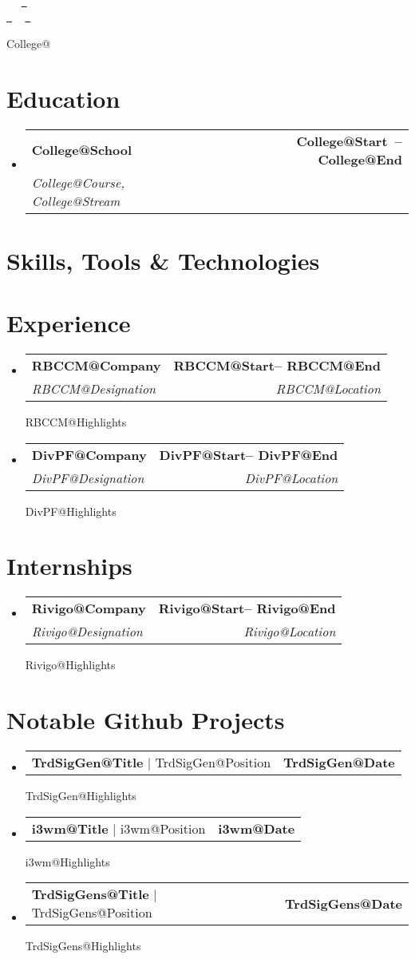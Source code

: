 \documentclass[letterpaper,11pt]{article}
\makeatletter
\newcommand{\describe}[2]{
    \csname #1@#2\endcsname
}
\newcommand{\resumeSubheading}[4]{
  \vspace{-2pt}\item
    \begin{tabular*}{1.0\textwidth}[t]{l@{\extracolsep{\fill}}r}
      \textbf{#1} & \textbf{\small #2} \\
      \textit{\small#3} & \textit{\small #4} \\
    \end{tabular*}\vspace{-7pt}
}
\newcommand{\resumeProjectHeading}[2]{
    \item
    \begin{tabular*}{1.001\textwidth}{l@{\extracolsep{\fill}}r}
      \small#1 & \textbf{\small #2}\\
    \end{tabular*}\vspace{-7pt}
}
\newcommand{\resumeSubHeadingListStart}{\begin{itemize}[leftmargin=0.0in, label={}]}
\newcommand{\resumeSubHeadingListEnd}{\end{itemize}}
\def\titlesection{
\begin{center}
    {\Huge \scshape \firstname \ \lastname} \\ \vspace{1pt}
    \small \raisebox{-0.1\height}\faPhone\ \jasphone ~ \href{mailto:\email}{\raisebox{-0.2\height}\faEnvelope\  \underline{\email}} \\
    \href{\linkedin}{\raisebox{-0.2\height}\faLinkedin\ \underline{\linkedin}}  ~
    \href{\github}{\raisebox{-0.2\height}\faGithub\ \underline{\github}}
    \vspace{-8pt}
\end{center}
}
\makeatother
\begin{document}
\titlesection
\profileSummary

\describe{College}{}

\section{Education}
  \resumeSubHeadingListStart
      \resumeSubheading{\csname College@School\endcsname}
      {\csname College@Start\endcsname \ -- \csname College@End\endcsname}
      {\csname College@Course\endcsname, \csname College@Stream\endcsname}{}
  \resumeSubHeadingListEnd
\section{Skills, Tools \& Technologies}
\achievements


\newcommand{\renderExp}[1]{
\resumeSubheading
      {\csname #1@Company\endcsname}{\csname #1@Start\endcsname -- \csname #1@End\endcsname}
      {\csname #1@Designation\endcsname}{\csname #1@Location\endcsname}
      \csname #1@Highlights\endcsname
}

\section{Experience}
    \resumeSubHeadingListStart
        \renderExp{RBCCM}
        \renderExp{DivPF} 
  \resumeSubHeadingListEnd

\section{Internships}
\resumeSubHeadingListStart
    \renderExp{Rivigo}
\resumeSubHeadingListEnd

\newcommand{\renderHck}[1]{
      \resumeProjectHeading
      {\textbf{\csname #1@Title\endcsname} $|$ \csname #1@Position\endcsname}
      {\csname #1@Date\endcsname}
      \csname #1@Highlights\endcsname
}

\vspace{-5pt}


\section{Notable Github Projects}
\vspace{-5pt}
\resumeSubHeadingListStart
    \renderHck{TrdSigGen}
    \vspace{-13pt}
    \renderHck{i3wm}
    \vspace{-13pt}
    \renderHck{TrdSigGens}
    \vspace{-13pt}
\resumeSubHeadingListEnd
\end{document}
